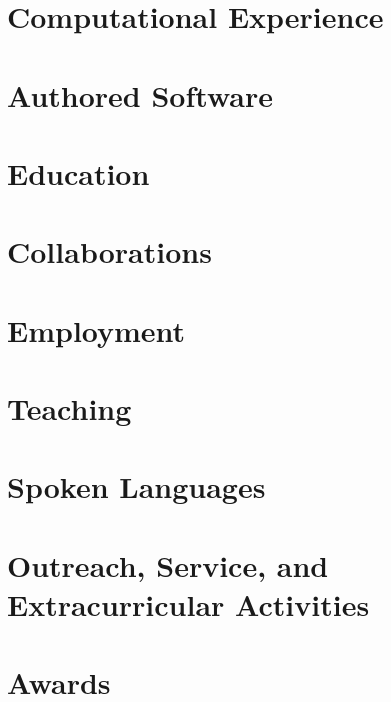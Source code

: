 \documentclass[10pt,letterpaper,roman]{moderncv} %
\begin{document}
% 
\makecvtitle %

\section{Computational Experience}


\section{Authored Software}


\section{Education}


\section{Collaborations}


\section{Employment}


\section{Teaching}


\section{Spoken Languages}


\section{Outreach, Service, and Extracurricular Activities}


\section{Awards}



\end{document}
